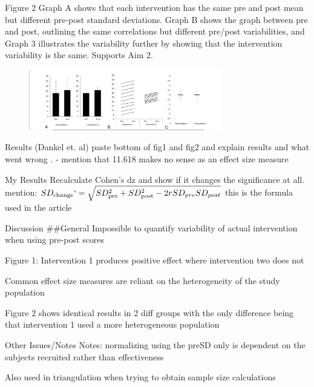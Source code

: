 \documentclass[
  ignorenonframetext,
  aspectratio=169,
]{beamer}
\begin{document}
\begin{frame}{Figure 2}
\protect\hypertarget{figure-2-1}{}
Graph A shows that each intervention has the same pre and post mean but
different pre-post standard deviations. Graph B shows the graph between
pre and post, outlining the same correlations but different pre/post
variabilities, and Graph 3 illustrates the variability further by
showing that the intervention variability is the same. Supports Aim 2.

\begin{figure}[h]
    \centering
    \includegraphics[width=0.75\textwidth]{fig2.png}
\end{figure}
\end{frame}

\begin{frame}{Results (Dankel et. al)}
\protect\hypertarget{results-dankel-et.-al}{}
paste bottom of fig1 and fig2 and explain results and what went wrong .
- mention that 11.618 makes no sense as an effect size measure
\end{frame}

\begin{frame}{My Results}
\protect\hypertarget{my-results}{}
Recalculate Cohen's dz and show if it changes the significance at all.
mention:
\(SD_\text{change}`=\sqrt{SD_{\text{pre}}^2+SD_{\text{post}}^2-2rSD_{pre}SD_{post}}\)
this is the formula used in the article
\end{frame}

\begin{frame}{Discussion}
\protect\hypertarget{discussion}{}
\#\#General Impossible to quantify variability of actual intervention
when using pre-post scores

Figure 1: Intervention 1 produces positive effect where intervention two
does not

Common effect size measures are reliant on the heterogeneity of the
study population

Figure 2 shows identical results in 2 diff groups with the only
difference being that intervention 1 used a more heterogeneous
population

\begin{block}{Other Issues/Notes}
\protect\hypertarget{other-issuesnotes}{}
Notes: normalizing using the preSD only is dependent on the subjects
recruited rather than effectiveness

Also used in triangulation when trying to obtain sample size
calculations
\end{block}
\end{frame}
\end{document}
